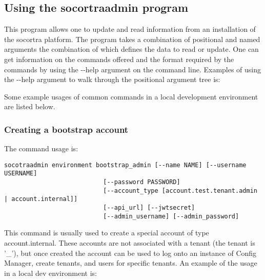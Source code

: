 \hypertarget{using-the-socortraadmin-program}{%
\subsection{Using the socortraadmin
program}\label{using-the-socortraadmin-program}}

This program allows one to update and read information from an
installation of the socortra platform. The program takes a combination
of positional and named arguments the combination of which defines the
data to read or update. One can get information on the commands offered
and the format required by the commands by using the -\/-help argument
on the command line. Examples of using the -\/-help argument to walk
through the positional argument tree is:

\begin{Shaded}
\begin{Highlighting}[]
\end{Highlighting}
\end{Shaded}

Some example usages of common commands in a local development
environment are listed below.

\hypertarget{creating-a-bootstrap-account}{%
\subsubsection{Creating a bootstrap
account}\label{creating-a-bootstrap-account}}

The command usage is:

\begin{verbatim}
socotraadmin environment bootstrap_admin [--name NAME] [--username USERNAME]
                           [--password PASSWORD]
                           [--account_type [account.test.tenant.admin | account.internal]]
                           [--api_url] [--jwtsecret]
                           [--admin_username] [--admin_password]
\end{verbatim}

This command is usually used to create a special account of type
account.internal. These accounts are not associated with a tenant (the
tenant is '\_'), but once created the account can be used to log onto an
instance of Config Manager, create tenants, and users for specific
tenants. An example of the usage in a local dev environment is:

